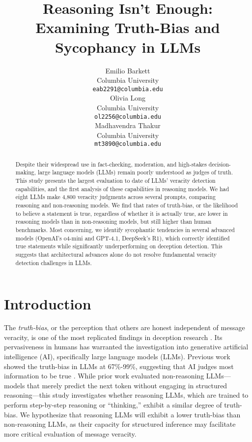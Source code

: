 \documentclass{article}
\title{Reasoning Isn't Enough: \\Examining Truth-Bias and Sycophancy in LLMs}
\author{%
  Emilio Barkett\\
  Columbia University\\
  \texttt{eab2291@columbia.edu} \\
   \And
   Olivia Long \\
   Columbia University \\
   \texttt{ol2256@columbia.edu} \\
   \And
   Madhavendra Thakur \\
   Columbia University \\
   \texttt{mt3890@columbia.edu} \\
}
\begin{document}
\maketitle

\begin{abstract}
\label{sec:abstract}
  Despite their widespread use in fact-checking, moderation, and high-stakes decision-making, large language models (LLMs) remain poorly understood as judges of truth. This study presents the largest evaluation to date of LLMs’ veracity detection capabilities, and the first analysis of these capabilities in reasoning models. We had eight LLMs make 4,800 veracity judgments across several prompts, comparing reasoning and non-reasoning models. We find that rates of truth-bias, or the likelihood to believe a statement is true, regardless of whether it is actually true, are lower in reasoning models than in non-reasoning models, but still higher than human benchmarks. Most concerning, we identify sycophantic tendencies in several advanced models (OpenAI's o4-mini and GPT-4.1, DeepSeek's R1), which correctly identified true statements while significantly underperforming on deception detection. This suggests that architectural advances alone do not resolve fundamental veracity detection challenges in LLMs.
\end{abstract}

\section{Introduction}
\label{sec:introduction}

The \textit{truth-bias}, or the perception that others are honest independent of message veracity, is one of the most replicated findings in deception research \citep{levine_duped_2020, levine_truth-default_2014}. Its pervasiveness in humans has warranted the investigation into generative artificial intelligence (AI), specifically large language models (LLMs). Previous work showed the truth-bias in LLMs at 67\%-99\%, suggesting that AI judges most information to be true \citep{markowitz_generative_2024}. While prior work evaluated non-reasoning LLMs---models that merely predict the next token without engaging in structured reasoning---this study investigates whether reasoning LLMs, which are trained to perform step-by-step reasoning or ``thinking,'' exhibit a similar degree of truth-bias. We hypothesize that reasoning LLMs will exhibit a lower truth-bias than non-reasoning LLMs, as their capacity for structured inference may facilitate more critical evaluation of message veracity.
\end{document}
